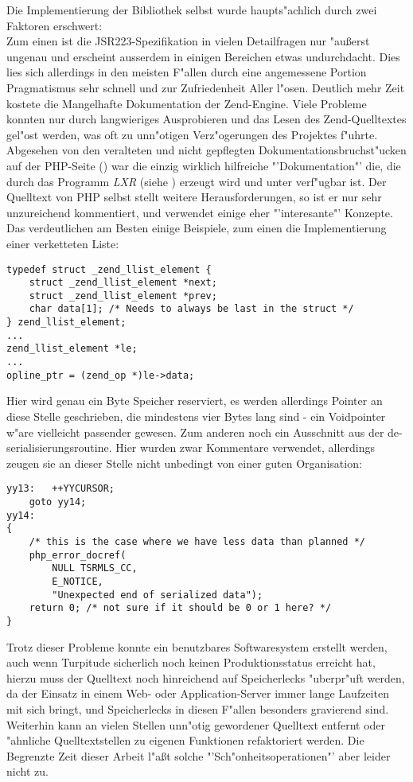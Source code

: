 Die Implementierung der Bibliothek selbst wurde haupts"achlich durch zwei Faktoren erschwert:\\
Zum einen ist die JSR223-Spezifikation in vielen Detailfragen nur "au\ss erst ungenau und erscheint ausserdem
in einigen Bereichen etwas undurchdacht. Dies lies sich allerdings in den meisten F"allen durch eine
angemessene Portion Pragmatismus sehr schnell und zur Zufriedenheit Aller l"osen. Deutlich mehr Zeit
kostete die Mangelhafte Dokumentation der Zend-Engine. Viele Probleme konnten nur durch langwieriges
Ausprobieren und das Lesen des Zend-Quelltextes gel"ost werden, was oft zu unn"otigen Verz"ogerungen 
des Projektes f"uhrte. Abgesehen von den veralteten und nicht gepflegten Dokumentationsbruchst"ucken
auf der PHP-Seite (\cite{PHPHP}) war die einzig wirklich hilfreiche "'Dokumentation"' die, die durch das Programm
\emph{LXR} (siehe \cite{LXRHP}) erzeugt wird und unter \cite{PHPLXR} verf"ugbar ist. Der Quelltext
von PHP selbst stellt weitere Herausforderungen, so ist er nur sehr unzureichend kommentiert, und verwendet
einige eher "'interesante"' Konzepte. Das verdeutlichen am Besten einige Beispiele, zum einen die 
Implementierung einer verketteten Liste:
\begin{lstlisting}[caption=Verkettete Liste im Zend-Code]
typedef struct _zend_llist_element {
    struct _zend_llist_element *next;
    struct _zend_llist_element *prev;
    char data[1]; /* Needs to always be last in the struct */
} zend_llist_element;
...
zend_llist_element *le;
...
opline_ptr = (zend_op *)le->data;
\end{lstlisting}
Hier wird genau ein Byte Speicher reserviert, es werden allerdings Pointer an diese Stelle geschrieben,
die mindestens vier Bytes lang sind - ein Voidpointer w"are vielleicht passender gewesen.
Zum anderen noch ein Ausschnitt aus der de-serialisierungsroutine. Hier wurden zwar Kommentare
verwendet, allerdings zeugen sie an dieser Stelle nicht unbedingt von einer guten Organisation:
\begin{lstlisting}[caption=lustiges Beispiel f"ur Zend-Code]
yy13:   ++YYCURSOR;
    goto yy14;
yy14:
{
    /* this is the case where we have less data than planned */
    php_error_docref(
        NULL TSRMLS_CC, 
        E_NOTICE, 
        "Unexpected end of serialized data");
    return 0; /* not sure if it should be 0 or 1 here? */
}
\end{lstlisting}

Trotz dieser Probleme konnte ein benutzbares Softwaresystem erstellt werden, auch wenn Turpitude sicherlich
noch keinen Produktionsstatus erreicht hat, hierzu muss der Quelltext noch hinreichend auf Speicherlecks
"uberpr"uft werden, da der Einsatz in einem Web- oder Application-Server immer lange Laufzeiten mit sich bringt,
und Speicherlecks in diesen F"allen besonders gravierend sind. Weiterhin kann an vielen Stellen unn"otig gewordener
Quelltext entfernt oder "ahnliche Quelltextstellen zu eigenen Funktionen refaktoriert werden. Die Begrenzte Zeit
dieser Arbeit l"a\ss t solche "'Sch"onheitsoperationen"' aber leider nicht zu.

